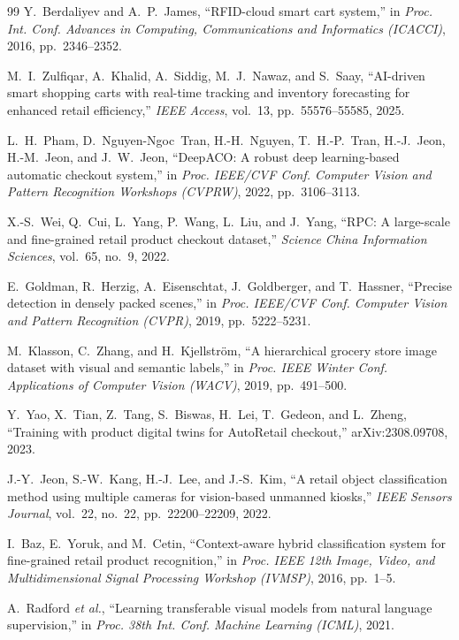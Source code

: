 \documentclass[conference]{IEEEtran}
\begin{document}
\begin{thebibliography}{99}
 Y.~Berdaliyev and A.~P.~James, ``RFID-cloud smart cart system,'' in \emph{Proc. Int.
Conf. Advances in Computing, Communications and Informatics (ICACCI)}, 2016, pp.~2346--2352.

 M.~I.~Zulfiqar, A.~Khalid, A.~Siddig, M.~J.~Nawaz, and S.~Saay, ``AI-driven smart
shopping carts with real-time tracking and inventory forecasting for enhanced retail efficiency,''
\emph{IEEE Access}, vol.~13, pp.~55576--55585, 2025.

 L.~H.~Pham, D.~Nguyen-Ngoc~Tran, H.-H.~Nguyen, T.~H.-P.~Tran, H.-J.~Jeon, H.-M.~Jeon,
and J.~W.~Jeon, ``DeepACO: A robust deep learning-based automatic checkout system,'' in \emph{Proc.
IEEE/CVF Conf. Computer Vision and Pattern Recognition Workshops (CVPRW)}, 2022, pp.~3106--3113.

 X.-S.~Wei, Q.~Cui, L.~Yang, P.~Wang, L.~Liu, and J.~Yang, ``RPC: A large-scale and
fine-grained retail product checkout dataset,'' \emph{Science China Information Sciences}, vol.~65,
no.~9, 2022.

 E.~Goldman, R.~Herzig, A.~Eisenschtat, J.~Goldberger, and T.~Hassner, ``Precise
detection in densely packed scenes,'' in \emph{Proc. IEEE/CVF Conf. Computer Vision and Pattern
Recognition (CVPR)}, 2019, pp.~5222--5231.

 M.~Klasson, C.~Zhang, and H.~Kjellstr\"om, ``A hierarchical grocery store image dataset
with visual and semantic labels,'' in \emph{Proc. IEEE Winter Conf. Applications of Computer Vision
(WACV)}, 2019, pp.~491--500.

 Y.~Yao, X.~Tian, Z.~Tang, S.~Biswas, H.~Lei, T.~Gedeon, and L.~Zheng, ``Training with
product digital twins for AutoRetail checkout,'' arXiv:2308.09708, 2023.

 J.-Y.~Jeon, S.-W.~Kang, H.-J.~Lee, and J.-S.~Kim, ``A retail object classification
method using multiple cameras for vision-based unmanned kiosks,'' \emph{IEEE Sensors Journal},
vol.~22, no.~22, pp.~22200--22209, 2022.

 I.~Baz, E.~Yoruk, and M.~Cetin, ``Context-aware hybrid classification system for
fine-grained retail product recognition,'' in \emph{Proc. IEEE 12th Image, Video, and
Multidimensional Signal Processing Workshop (IVMSP)}, 2016, pp.~1--5.

 A.~Radford \emph{et al.}, ``Learning transferable visual models from natural language
supervision,'' in \emph{Proc. 38th Int. Conf. Machine Learning (ICML)}, 2021.


\end{thebibliography}
\end{document}
